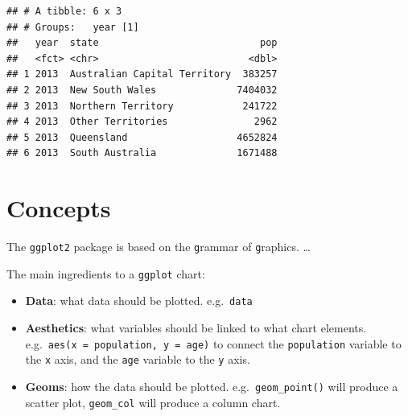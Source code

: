 \documentclass[]{book}
\newenvironment{Shaded}{\begin{snugshade}}{\end{snugshade}}
\newcommand{\CommentTok}[1]{\textcolor[rgb]{0.56,0.35,0.01}{\textit{#1}}}
\newcommand{\DataTypeTok}[1]{\textcolor[rgb]{0.13,0.29,0.53}{#1}}
\newcommand{\KeywordTok}[1]{\textcolor[rgb]{0.13,0.29,0.53}{\textbf{#1}}}
\newcommand{\NormalTok}[1]{#1}
\newcommand{\OperatorTok}[1]{\textcolor[rgb]{0.81,0.36,0.00}{\textbf{#1}}}
\newcommand{\StringTok}[1]{\textcolor[rgb]{0.31,0.60,0.02}{#1}}
\providecommand{\tightlist}{%
  \setlength{\itemsep}{0pt}\setlength{\parskip}{0pt}}
\begin{document}
\begin{Shaded}
\end{Shaded}

\begin{verbatim}
## # A tibble: 6 x 3
## # Groups:   year [1]
##   year  state                            pop
##   <fct> <chr>                          <dbl>
## 1 2013  Australian Capital Territory  383257
## 2 2013  New South Wales              7404032
## 3 2013  Northern Territory            241722
## 4 2013  Other Territories               2962
## 5 2013  Queensland                   4652824
## 6 2013  South Australia              1671488
\end{verbatim}

\hypertarget{concepts}{%
\section{Concepts}\label{concepts}}

The \texttt{ggplot2} package is based on the \texttt{g}rammar of \texttt{g}raphics. \ldots{}

The main ingredients to a \texttt{ggplot} chart:

\begin{itemize}
\tightlist
\item
  \textbf{Data}: what data should be plotted. e.g.~\texttt{data}
\item
  \textbf{Aesthetics}: what variables should be linked to what chart elements. e.g.~\texttt{aes(x\ =\ population,\ y\ =\ age)} to connect the \texttt{population} variable to the \texttt{x} axis, and the \texttt{age} variable to the \texttt{y} axis.
\item
  \textbf{Geoms}: how the data should be plotted. e.g.~\texttt{geom\_point()} will produce a scatter plot, \texttt{geom\_col} will produce a column chart.
\end{itemize}
\end{document}
